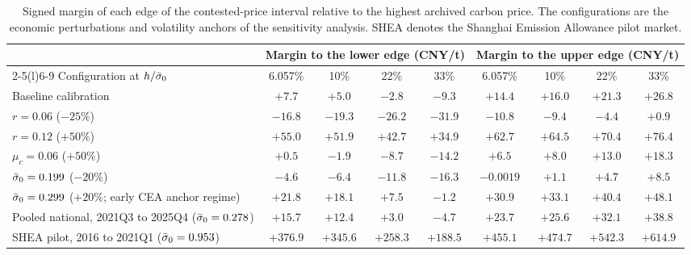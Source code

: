 \begin{table}[!t]
\caption{Signed margin of each edge of the contested-price interval relative to the highest archived carbon price. The configurations are the economic perturbations and volatility anchors of the sensitivity analysis. SHEA denotes the Shanghai Emission Allowance pilot market.}
\label{tab:margins}
\centering
\footnotesize
\setlength{\tabcolsep}{4pt}
\begin{tabular}{@{}lcccccccc@{}}
\toprule
 & \multicolumn{4}{c}{Margin to the lower edge (CNY/t)} & \multicolumn{4}{c}{Margin to the upper edge (CNY/t)}\\
\cmidrule(lr){2-5}\cmidrule(l){6-9}
Configuration at $h/\bar{\sigma}_0$ & 6.057\% & 10\% & 22\% & 33\% & 6.057\% & 10\% & 22\% & 33\%\\
\midrule
Baseline calibration & $+7.7$ & $+5.0$ & $-2.8$ & $-9.3$ & $+14.4$ & $+16.0$ & $+21.3$ & $+26.8$\\
$r=0.06$ ($-25\%$) & $-16.8$ & $-19.3$ & $-26.2$ & $-31.9$ & $-10.8$ & $-9.4$ & $-4.4$ & $+0.9$\\
$r=0.12$ ($+50\%$) & $+55.0$ & $+51.9$ & $+42.7$ & $+34.9$ & $+62.7$ & $+64.5$ & $+70.4$ & $+76.4$\\
$\mu_c=0.06$ ($+50\%$) & $+0.5$ & $-1.9$ & $-8.7$ & $-14.2$ & $+6.5$ & $+8.0$ & $+13.0$ & $+18.3$\\
$\bar{\sigma}_0=0.199$ ($-20\%$) & $-4.6$ & $-6.4$ & $-11.8$ & $-16.3$ & $-0.0019$ & $+1.1$ & $+4.7$ & $+8.5$\\
$\bar{\sigma}_0=0.299$ ($+20\%$; early CEA anchor regime) & $+21.8$ & $+18.1$ & $+7.5$ & $-1.2$ & $+30.9$ & $+33.1$ & $+40.4$ & $+48.1$\\
Pooled national, 2021Q3 to 2025Q4 ($\bar{\sigma}_0=0.278$) & $+15.7$ & $+12.4$ & $+3.0$ & $-4.7$ & $+23.7$ & $+25.6$ & $+32.1$ & $+38.8$\\
SHEA pilot, 2016 to 2021Q1 ($\bar{\sigma}_0=0.953$) & $+376.9$ & $+345.6$ & $+258.3$ & $+188.5$ & $+455.1$ & $+474.7$ & $+542.3$ & $+614.9$\\
\bottomrule
\end{tabular}
\par\smallskip

\end{table}
